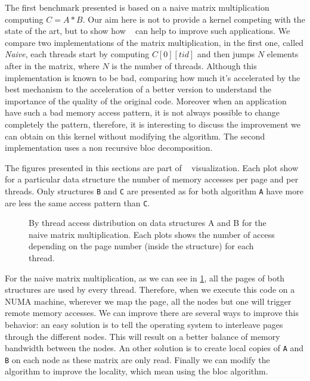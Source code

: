 The first benchmark presented is based on a naive matrix multiplication
computing $C=A*B$. Our aim here is not to provide a kernel competing with the
state of the art, but to show how \TABARNAC~ can help to improve such
applications. We compare two implementations of the matrix multiplication, in
the first one, called \emph{Naive}, each threads start by computing
$C[0][tid]$ and then jumps $N$ elements after in the matrix, where $N$ is the
number of threads. Although this implementation is known to be bad, comparing
how much it's accelerated by the best mechanism to the acceleration of a
better version to understand the importance of the quality of the original
code. Moreover when an application have such a bad memory access pattern, it
is not always possible to change completely the pattern, therefore, it is
interesting to discuss the improvement we can obtain on this kernel without
modifying the algorithm. The second implementation uses a non recursive bloc
decomposition.

The figures presented in this sections are part of \TABARNAC~ visualization.
Each plot show for a particular data structure the number of memory accesses
per page and per threads. Only structures \texttt{B} and \texttt{C} are
presented as for both algorithm \texttt{A} have more are less the same access
pattern than \texttt{C}.

\begin{figure}[htb]
    \centering
    \caption{By thread access distribution on data structures A and B for the
        naive matrix multiplication. Each plots shows the number of access
    depending on the page number (inside the structure) for each thread.}
    \label{fig:matrix-naive}
\end{figure}

For the naive matrix multiplication, as we can see in
\ref{fig:matrix-naive}, all the pages of both structures are used by every
thread. Therefore, when we execute this code on a NUMA machine, wherever we
map the page, all the nodes but one will trigger remote memory accesses. We
can improve there are several ways to improve this behavior: an easy solution
is to tell the operating system to interleave pages through the different
nodes. This will result on a better balance of memory bandwidth between the
nodes. An other solution is to create local copies of \texttt{A} and
\texttt{B} on each node as these matrix are only read. Finally we can modify
the algorithm to improve the locality, which mean using the bloc algorithm.

